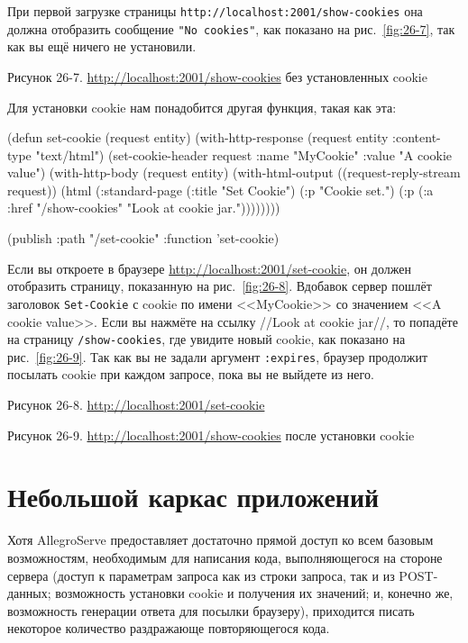 При первой загрузке страницы \lstinline{http://localhost:2001/show-cookies} она должна
отобразить сообщение \lstinline{"No cookies"}, как показано на рис.~\ref{fig:26-7}, так как
вы ещё ничего не установили.

Рисунок 26-7. \url{http://localhost:2001/show-cookies} без установленных cookie

Для установки cookie нам понадобится другая функция, такая как эта:

\begin{myverb}
  (defun set-cookie (request entity)
    (with-http-response (request entity :content-type "text/html")
      (set-cookie-header request :name "MyCookie" :value "A cookie value")
      (with-http-body (request entity)
        (with-html-output ((request-reply-stream request))
          (html 
            (:standard-page
             (:title "Set Cookie")
             (:p "Cookie set.")
             (:p (:a :href "/show-cookies" "Look at cookie jar."))))))))

  (publish :path "/set-cookie" :function 'set-cookie)
\end{myverb}

Если вы откроете в браузере \url{http://localhost:2001/set-cookie}, он должен отобразить
страницу, показанную на рис.~\ref{fig:26-8}. Вдобавок сервер пошлёт заголовок
\lstinline{Set-Cookie} с cookie по имени <<MyCookie>> со значением <<A cookie value>>. Если вы
нажмёте на ссылку //Look at cookie jar//, то попадёте на страницу \lstinline{/show-cookies},
где увидите новый cookie, как показано на рис.~\ref{fig:26-9}. Так как вы не задали
аргумент \lstinline{:expires}, браузер продолжит посылать cookie при каждом запросе, пока вы не
выйдете из него.

Рисунок 26-8. \url{http://localhost:2001/set-cookie}

Рисунок 26-9. \url{http://localhost:2001/show-cookies} после установки cookie

\section{Небольшой каркас приложений}

Хотя AllegroServe предоставляет достаточно прямой доступ ко всем базовым возможностям,
необходимым для написания кода, выполняющегося на стороне сервера (доступ к параметрам
запроса как из строки запроса, так и из POST-данных; возможность установки cookie и
получения их значений; и, конечно же, возможность генерации ответа для посылки
браузеру), приходится писать некоторое количество раздражающе повторяющегося кода.

